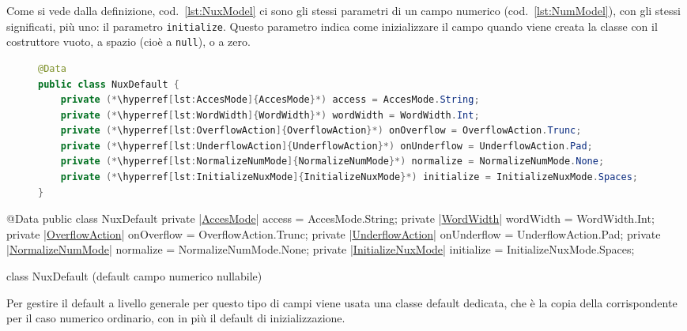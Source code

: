 Come si vede dalla definizione, cod.~\ref{lst:NuxModel} ci sono gli stessi
parametri di un campo numerico (cod.~\ref{lst:NumModel}), con gli stessi 
significati, più uno: il parametro \verb!initialize!.
Questo parametro indica come inizializzare il campo quando viene creata la
classe con il costruttore vuoto, a spazio (cioè a \verb!null!), o a zero.

\ifesource
\begin{figure*}[!htb]
\begin{lstlisting}[language=java, 
caption=class NuxDefault (default campo numerico nullabile), 
label=lst:NuxDefault]
@Data
public class NuxDefault {
    private (*\hyperref[lst:AccesMode]{AccesMode}*) access = AccesMode.String;
    private (*\hyperref[lst:WordWidth]{WordWidth}*) wordWidth = WordWidth.Int;
    private (*\hyperref[lst:OverflowAction]{OverflowAction}*) onOverflow = OverflowAction.Trunc;
    private (*\hyperref[lst:UnderflowAction]{UnderflowAction}*) onUnderflow = UnderflowAction.Pad;
    private (*\hyperref[lst:NormalizeNumMode]{NormalizeNumMode}*) normalize = NormalizeNumMode.None;
    private (*\hyperref[lst:InitializeNuxMode]{InitializeNuxMode}*) initialize = InitializeNuxMode.Spaces;
}
\end{lstlisting}
\end{figure*}
\else
\begin{elisting}[!htb]
\begin{javacode}
@Data
public class NuxDefault {
    private |\hyperref[lst:AccesMode]{AccesMode}| access = AccesMode.String;
    private |\hyperref[lst:WordWidth]{WordWidth}| wordWidth = WordWidth.Int;
    private |\hyperref[lst:OverflowAction]{OverflowAction}| onOverflow = OverflowAction.Trunc;
    private |\hyperref[lst:UnderflowAction]{UnderflowAction}| onUnderflow = UnderflowAction.Pad;
    private |\hyperref[lst:NormalizeNumMode]{NormalizeNumMode}| normalize = NormalizeNumMode.None;
    private |\hyperref[lst:InitializeNuxMode]{InitializeNuxMode}| initialize = InitializeNuxMode.Spaces;
}
\end{javacode}
\caption{class NuxDefault (default campo numerico nullabile)}
\label{lst:NuxDefault}
\end{elisting}
\fi

Per gestire il default a livello generale per questo tipo di campi viene usata
una classe default dedicata, che è la copia della corrispondente per il caso
numerico ordinario, con in più il default di inizializzazione.

